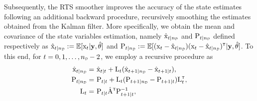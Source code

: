 %
%
%
Subsequently, the RTS smoother improves the accuracy of the state estimates following an additional backward procedure, recursively smoothing the estimates obtained from the Kalman filter. More specifically, we obtain the mean and covariance of the state variables estimation, namely  $\hat{\vcx}_{t|{\nD}}$ and $\mxP_{t|{\nD}}$ defined respectively as $\hat{\vcx}_{t|{\nD}} := \mathbb{E}[\vcx_t|\mathbf{y},\hat{\vctheta}]$ and $\mxP_{t|{\nD}} := \mathbb{E}[(\vcx_t - \hat{\vcx}_{t|{\nD}})(\vcx_t - \hat{\vcx}_{t|{\nD}})^\tr|\mathbf{y},\hat{\vctheta}]$. To this end, for $t = 0,1, \ldots, \nD-2$, we employ a recursive procedure as 
\begin{equation}\label{eq:mean and covariance}
    \begin{split}
        \hat{\vcx}_{t|{\nD}}   =&\,\, \hat{\vcx}_{t|t} + {\mxL}_t(\hat{\vcx}_{t+1|\nD} - \hat{\vcx}_{t+1|t}),\\
        \mxP_{t|{\nD}}   =&\,\, \mxP_{t|t} + {\mxL}_t(\mxP_{t+1|{\nD}} - \mxP_{t+1|t}){\mxL}_t^\tr,\\
        \mxL_t   =&\,\, \mxP_{t|t}\hat{\mxA}^\tr\mxP_{t+1|t}^{-1},\\
    \end{split}
\end{equation}
